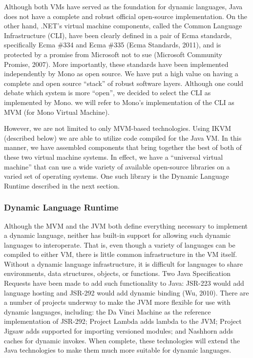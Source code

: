 \documentclass[preprint]{sigplanconf}
\begin{document}
Although both VMs have served as the foundation for dynamic languages,
Java does not have a complete and robust official open-source
implementation. On the other hand, .NET’s virtual machine components,
called the Common Language Infrastructure (CLI), have been clearly
defined in a pair of Ecma standards, specifically Ecma \#334 and Ecma
\#335 (Ecma Standards, 2011), and is protected by a promise from
Microsoft not to sue (Microsoft Community Promise, 2007). More
importantly, these standards have been implemented independently by
Mono as open source. We have put a high value on having a complete and
open source ``stack'' of robust software layers. Although one could
debate which system is more ``open'', we decided to select the CLI as
implemented by Mono. we will refer to Mono's implementation of the CLI
as MVM (for Mono Virtual Machine).

However, we are not limited to only MVM-based technologies. Using IKVM
(described below) we are able to utilize code compiled for the Java
VM. In this manner, we have assembled components that bring together
the best of both of these two virtual machine systems. In effect, we
have a ``universal virtual machine'' that can use a wide variety of
available open-source libraries on a varied set of operating
systems. One such library is the Dynamic Language Runtime described in
the next section.

\subsubsection{Dynamic Language Runtime}

Although the MVM and the JVM both define everything necessary to
implement a dynamic language, neither has built-in support for
allowing such dynamic languages to interoperate. That is, even though
a variety of languages can be compiled to either VM, there is little
common infrastructure in the VM itself. Without a dynamic language
infrastructure, it is difficult for languages to share environments,
data structures, objects, or functions. Two Java Specification
Requests have been made to add such functionality to Java: JSR-223
would add language hosting and JSR-292 would add dynamic binding (Wu,
2010). There are a number of projects underway to make the JVM more
flexible for use with dynamic languages, including: the Da Vinci
Machine \cite{davinci} as the reference implementation of JSR-292; Project Lambda
adds lambda to the JVM; Project Jigsaw adds supported for importing
versioned modules; and Nashhorn adds caches for dynamic invokes. When
complete, these technologies will extend the Java technologies to make
them much more suitable for dynamic languages.
\end{document}
